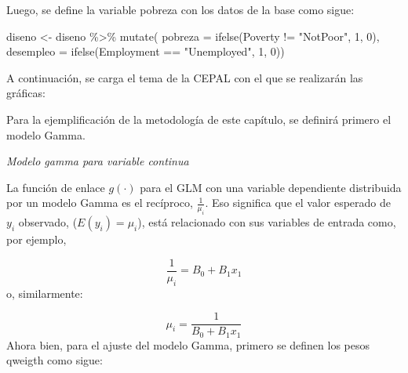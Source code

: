 \documentclass[
  12pt,
]{book}
\newenvironment{Shaded}{\begin{snugshade}}{\end{snugshade}}
\newcommand{\AttributeTok}[1]{\textcolor[rgb]{0.77,0.63,0.00}{#1}}
\newcommand{\DecValTok}[1]{\textcolor[rgb]{0.00,0.00,0.81}{#1}}
\newcommand{\FunctionTok}[1]{\textcolor[rgb]{0.00,0.00,0.00}{#1}}
\newcommand{\NormalTok}[1]{#1}
\newcommand{\OtherTok}[1]{\textcolor[rgb]{0.56,0.35,0.01}{#1}}
\newcommand{\SpecialCharTok}[1]{\textcolor[rgb]{0.00,0.00,0.00}{#1}}
\newcommand{\StringTok}[1]{\textcolor[rgb]{0.31,0.60,0.02}{#1}}
\begin{document}
Luego, se define la variable pobreza con los datos de la base como sigue:

\begin{Shaded}
\begin{Highlighting}[]
\NormalTok{diseno }\OtherTok{\textless{}{-}}\NormalTok{ diseno }\SpecialCharTok{\%\textgreater{}\%} 
  \FunctionTok{mutate}\NormalTok{(}
  \AttributeTok{pobreza =} \FunctionTok{ifelse}\NormalTok{(Poverty }\SpecialCharTok{!=} \StringTok{"NotPoor"}\NormalTok{, }\DecValTok{1}\NormalTok{, }\DecValTok{0}\NormalTok{),}
  \AttributeTok{desempleo =} \FunctionTok{ifelse}\NormalTok{(Employment }\SpecialCharTok{==} \StringTok{"Unemployed"}\NormalTok{, }\DecValTok{1}\NormalTok{, }\DecValTok{0}\NormalTok{))}
\end{Highlighting}
\end{Shaded}

A continuación, se carga el tema de la CEPAL con el que se realizarán las gráficas:

Para la ejemplificación de la metodología de este capítulo, se definirá primero el modelo Gamma.

\emph{Modelo gamma para variable continua}

La función de enlace \(g(\cdot)\) para el GLM con una variable dependiente distribuida por un modelo Gamma es el recíproco, \(\frac{1}{\mu_{i}}\). Eso significa que el valor esperado de \(y_i\) observado, (\(E(y_i) = \mu_i\)), está relacionado con sus variables de entrada como, por ejemplo,

\[
\frac{1}{\mu_{i}} = B_0 + B_1x_1
\]
o, similarmente:

\[
\mu_{i} = \frac{1}{B_0 + B_1x_1}
\]
Ahora bien, para el ajuste del modelo Gamma, primero se definen los pesos qweigth como sigue:

\begin{Shaded}
\end{Shaded}
\end{document}
